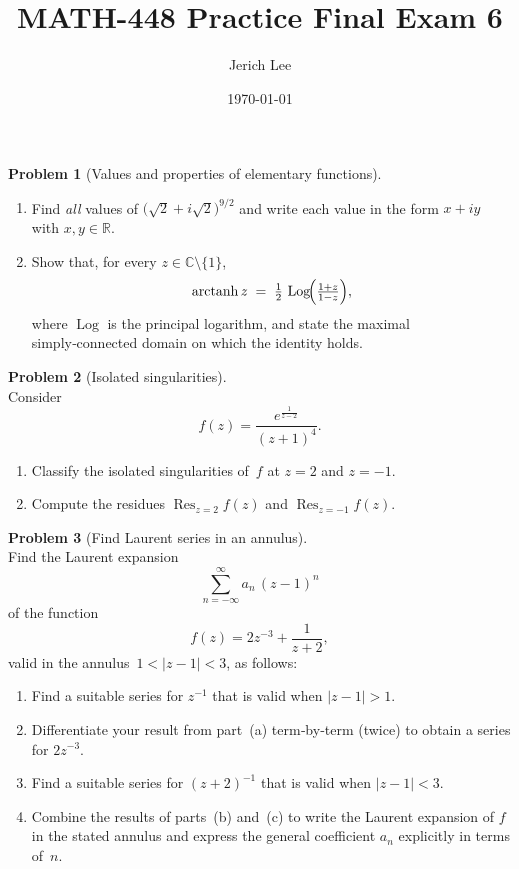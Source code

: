 \documentclass[12pt]{article}
\title{MATH-448 Practice Final Exam 6}
\author{Jerich Lee}
\date{\today}
\DeclareMathOperator{\Log}{Log}
\DeclareMathOperator{\arctanh}{arctanh}
\theoremstyle{definition} %
\newtheorem{problem}{Problem}
\theoremstyle{plain} %
\begin{document}
\maketitle
\pagebreak
  
  \begin{problem}[Values and properties of elementary functions]\mbox{}\\[4pt]
  \begin{enumerate}[label=(\alph*),itemsep=6pt]
    \item Find \emph{all} values of $\bigl(\sqrt{2}+i\sqrt{2}\bigr)^{9/2}$ and write each value in the form $x+iy$ with $x,y\in\mathbb{R}$.
    \item Show that, for every $z\in\mathbb{C}\setminus\{1\}$,
          \[
            \arctanh z
            \;=\;
            \tfrac12\,
            \Log\!\Bigl(\tfrac{1+z}{1-z}\Bigr),
          \]
          where $\Log$ is the principal logarithm, and state the maximal simply‑connected domain on which the identity holds.
  \end{enumerate}
  \end{problem}
  
  \pagebreak
  \begin{problem}[Isolated singularities]\mbox{}\\[4pt]
  Consider
  \[
    f(z)=\frac{e^{\frac{1}{z-2}}}{(z+1)^{4}}.
  \]
  \begin{enumerate}[label=(\alph*),itemsep=6pt]
    \item Classify the isolated singularities of $f$ at $z=2$ and $z=-1$.
    \item Compute the residues $\operatorname*{Res}_{z=2}f(z)$ and $\operatorname*{Res}_{z=-1}f(z)$.
  \end{enumerate}
  \end{problem}
  
  \pagebreak
  \begin{problem}[Find Laurent series in an annulus]\mbox{}\\[4pt]
  Find the Laurent expansion
  \[
    \sum_{n=-\infty}^{\infty} a_{n}\,(z-1)^{n}
  \]
  of the function
  \[
    f(z)=2z^{-3}+\frac{1}{z+2},
  \]
  valid in the annulus \(1<\lvert z-1\rvert<3\), as follows:
  \begin{enumerate}[label=(\alph*),itemsep=6pt]
    \item Find a suitable series for \(z^{-1}\) that is valid when \(\lvert z-1\rvert>1\).
    \item Differentiate your result from part (a) term‑by‑term (twice) to obtain a series for \(2z^{-3}\).
    \item Find a suitable series for \((z+2)^{-1}\) that is valid when \(\lvert z-1\rvert<3\).
    \item Combine the results of parts (b) and (c) to write the Laurent expansion of \(f\) in the stated annulus and express the general coefficient \(a_{n}\) explicitly in terms of \(n\).
  \end{enumerate}
  \end{problem}
  
\end{document}
